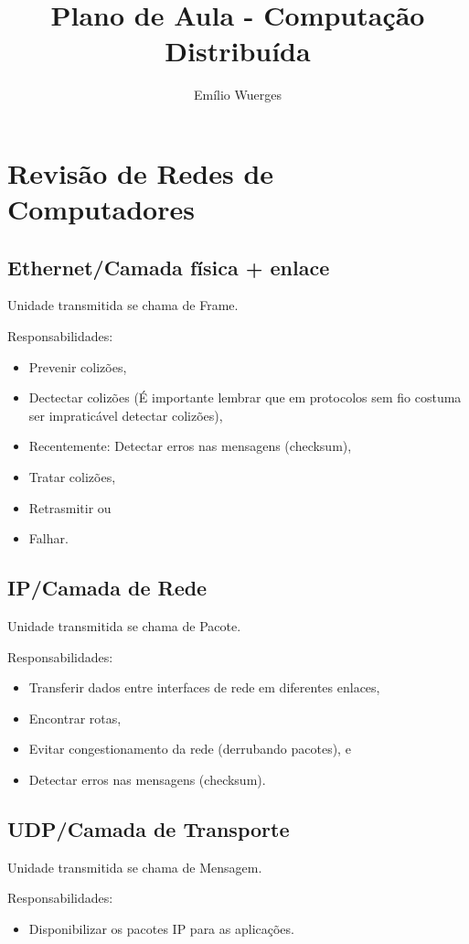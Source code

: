 \documentclass{book}
\author{Emílio Wuerges}
\title{Plano de Aula - Computação Distribuída}
\begin{document}
\chapter{Revisão de Redes de Computadores}


\section{Ethernet/Camada física + enlace}

Unidade transmitida se chama de Frame.

Responsabilidades:
\begin{itemize}
\item Prevenir colizões,
\item Dectectar colizões (É importante lembrar que em protocolos sem fio 
costuma ser impraticável detectar colizões),
\item Recentemente: Detectar erros nas mensagens (checksum),
\item Tratar colizões,
\item Retrasmitir ou
\item Falhar.
\end{itemize}

\section{IP/Camada de Rede}

Unidade transmitida se chama de Pacote.

Responsabilidades:

\begin{itemize}
\item Transferir dados entre interfaces de rede em diferentes enlaces,
\item Encontrar rotas,
\item Evitar congestionamento da rede (derrubando pacotes), e
\item Detectar erros nas mensagens (checksum).
\end{itemize}

\section{UDP/Camada de Transporte}

Unidade transmitida se chama de Mensagem.

Responsabilidades:
\begin{itemize}
\item Disponibilizar os pacotes IP para as aplicações.
\end{itemize}
\end{document}

